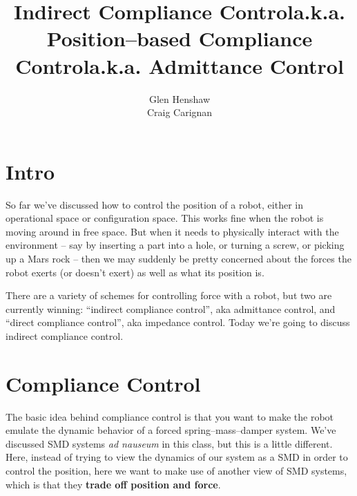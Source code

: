 \documentclass[]{article}
\title{Indirect Compliance Control\linebreak a.k.a. Position--based Compliance Control\linebreak a.k.a. Admittance Control}
\author{Glen Henshaw\\Craig Carignan}
\begin{document}
\maketitle

\section{Intro}
So far we've discussed how to control the position of a robot, either in operational space or configuration space. This works fine when the robot is moving around in free space. But when it needs to physically interact with the environment -- say by inserting a part into a hole, or turning a screw, or picking up a Mars rock -- then we may suddenly be pretty concerned about the forces the robot exerts (or doesn't exert) as well as what its position is.

There are a variety of schemes for controlling force with a robot, but two are currently winning: ``indirect compliance control'', aka admittance control, and ``direct compliance control'', aka impedance control. Today we're going to discuss indirect compliance control.

\section{Compliance Control}
The basic idea behind compliance control is that you want to make the robot emulate the dynamic behavior of a forced spring--mass--damper system. We've discussed SMD systems \textit{ad nauseum} in this class, but this is a little different. Here, instead of trying to view the dynamics of our system as a SMD in order to control the position, here we want to make use of another view of SMD systems, which is that they \textbf{trade off position and force}.
\pagebreak
\end{document}
